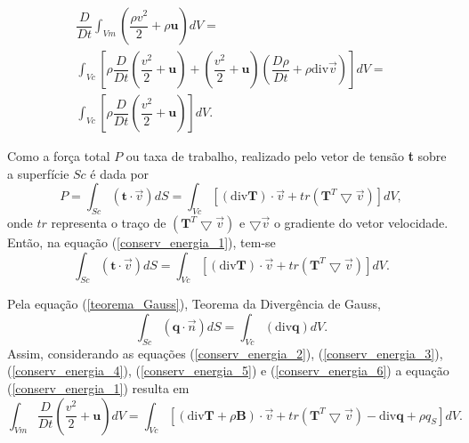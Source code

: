 \begin{eqnarray} \label{conserv_energia_3}
\dfrac{D}{Dt} \int_{Vm} \left( \dfrac{ \rho v^{2}}{2} + \rho \textbf{u} \right) dV = \nonumber \\
\int_{Vc} \left[ \rho \dfrac{D}{Dt} \left( \dfrac{v^{2}}{2} + \textbf{u} \right) + \left( \dfrac{v^{2}}{2} + \textbf{u} \right) \left( \dfrac{D \rho}{Dt} + \rho \mbox{div} \vec{v} \right) \right] dV = \nonumber \\
\int_{Vc} \left[ \rho \dfrac{D}{Dt} \left( \dfrac{v^{2}}{2} + \textbf{u} \right) \right] dV.
\end{eqnarray}

Como a força total $ P $ ou taxa de trabalho, realizado pelo vetor de tensão \textbf{t} sobre a superfície $ Sc $ é dada por
\begin{equation} \label{conserv_energia_4}
P = \int_{Sc}( \textbf{t} \cdot \vec{v}) dS = \int_{Vc} [(\mbox{div} \textbf{T}) \cdot \vec{v} + tr( \textbf{T} ^{T} \bigtriangledown \vec{v} ) ] dV,
\end{equation} 
onde $ tr $ representa o traço de $( \textbf{T} ^{T} \bigtriangledown \vec{v} ) $ e $\bigtriangledown \vec{v}$ o gradiente do vetor velocidade. Então, na equação (\ref{conserv_energia_1}), tem-se 
\begin{equation} \label{conserv_energia_5}
\int_{Sc}( \textbf{t} \cdot \vec{v}) dS = \int_{Vc} [(\mbox{div} \textbf{T}) \cdot \vec{v} + tr( \textbf{T} ^{T} \bigtriangledown \vec{v} ) ] dV.
\end{equation}

Pela equação (\ref{teorema_Gauss}), Teorema da Divergência de Gauss,
\begin{equation} \label{conserv_energia_6}
\int_{Sc}( \textbf{q} \cdot \vec{n}) dS = \int_{Vc} (\mbox{div} \textbf{q}) dV.
\end{equation} 
Assim, considerando as equações (\ref{conserv_energia_2}), (\ref{conserv_energia_3}), (\ref{conserv_energia_4}), (\ref{conserv_energia_5}) e (\ref{conserv_energia_6}) a equação (\ref{conserv_energia_1}) resulta em
\begin{equation} \label{conserv_energia_7}
\int_{Vm} \dfrac{D}{Dt} \left( \dfrac{v^{2}}{2} + \textbf{u} \right) dV = \int_{Vc} [( \mbox{div} \textbf{T} + \rho \textbf{B}) \cdot \vec{v} + tr ( \textbf{T} ^{T} \bigtriangledown \vec{v}) - \mbox{div} \textbf{q} + \rho q_{S}] dV.
\end{equation}

